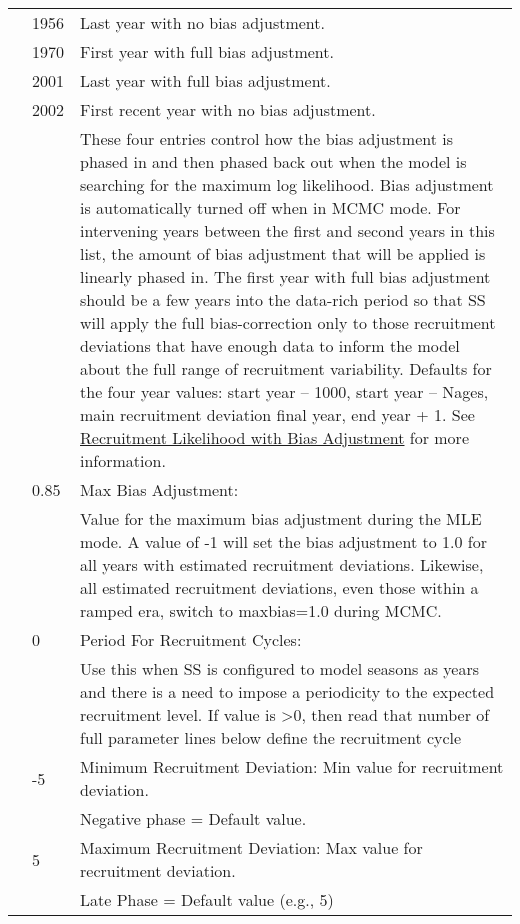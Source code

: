 \begin{longtable}{p{1cm} p{3cm} p{11cm}}
	\Tstrut & 1956 & Last year with no bias adjustment. \\
			& 1970 & First year with full bias adjustment. \\
			& 2001 & Last year with full bias adjustment. \\
			& 2002 & First recent year with no bias adjustment. \\
			&      & These four entries control how the bias adjustment is phased in and then phased back out when the model is searching for the maximum log likelihood.  Bias adjustment is automatically turned off when in MCMC mode.  For intervening years between the first and second years in this list, the amount of bias adjustment that will be applied is linearly phased in.  The first year with full bias adjustment should be a few years into the data-rich period so that SS will apply the full bias-correction only to those recruitment deviations that have enough data to inform the model about the full range of recruitment variability.  Defaults for the four year values: start year – 1000, start year – Nages, main recruitment deviation final year, end year + 1. See \hyperlink{RecBias}{Recruitment Likelihood with Bias Adjustment} for more information.\\
	
	\Tstrut & 0.85 & Max Bias Adjustment: \\
			&      & Value for the maximum bias adjustment during the MLE mode. A value of -1 will set the bias adjustment to 1.0 for all years with estimated recruitment deviations. Likewise, all estimated recruitment deviations, even those within a ramped era, switch to maxbias=1.0 during MCMC.\\

	\Tstrut & 0    & Period For Recruitment Cycles: \\
			&      & Use this when SS is configured to model seasons as years and there is a need to impose a periodicity to the expected recruitment level.  If value is >0, then read that number of full parameter lines below define the recruitment cycle \\
	
	\Tstrut & -5   & Minimum Recruitment Deviation: Min value for recruitment deviation.\\
			&      & Negative phase = Default value.\\

	\Tstrut & 5    & Maximum Recruitment Deviation: Max value for recruitment deviation. \\
			&      & Late Phase = Default value (e.g., 5)\\
	

\end{longtable}
